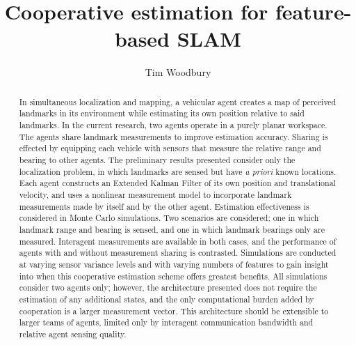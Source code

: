 \documentclass{aiaa-tc}
\title{Cooperative estimation for feature-based SLAM}
\author{Tim Woodbury}
\begin{document}
\maketitle

\begin{abstract}
In simultaneous localization and mapping, a vehicular agent creates a map of perceived landmarks in its environment while estimating its own position relative to said landmarks. In the current research, two agents operate in a purely planar workspace. The agents share landmark measurements to improve estimation accuracy. Sharing is effected by equipping each vehicle with sensors that measure the relative range and bearing to other agents. The preliminary results presented consider only the localization problem, in which landmarks are sensed but have \textit{a priori} known locations. Each agent constructs an Extended Kalman Filter of its own position and translational velocity, and uses a nonlinear measurement model to incorporate landmark measurements made by itself and by the other agent. Estimation effectiveness is considered in Monte Carlo simulations. Two scenarios are considered; one in which landmark range and bearing is sensed, and one in which landmark bearings only are measured. Interagent measurements are available in both cases, and the performance of agents with and without measurement sharing is contrasted. Simulations are conducted at varying sensor variance levels and with varying numbers of features to gain insight into when this cooperative estimation scheme offers greatest benefits. All simulations consider two agents only; however, the architecture presented does not require the estimation of any additional states, and the only computational burden added by cooperation is a larger measurement vector. This architecture should be extensible to larger teams of agents, limited only by interagent communication bandwidth and relative agent sensing quality.
\end{abstract}
\end{document}
